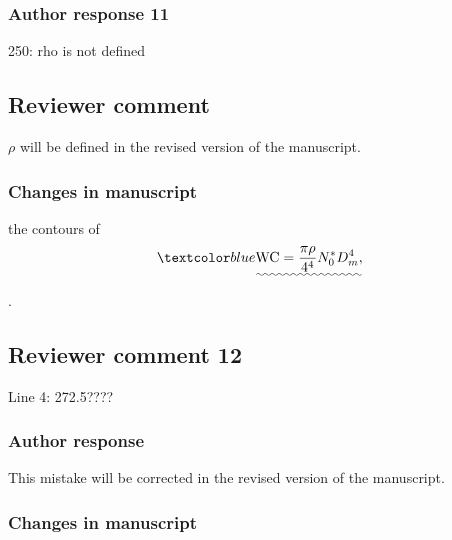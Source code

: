 %

\subsubsection*{Author response 11}
250: rho is not defined

\subsection*{Reviewer comment}

$\rho$ will be defined in the revised version of the manuscript.

\subsubsection*{Changes in manuscript}

\begin{change}[276]
\DIFaddend the contours of \DIFdelbegin {}\DIFdelend \DIFaddbegin {}\begin{align}
\DIFadd{\text{WC} = \frac{\pi \rho}{4 ^ 4}N_0^* D_m^4,
}\end{align}
\DIFaddend .
\end{change}

\subsection*{Reviewer comment 12}
Line 4: 272.5????

\subsubsection*{Author response}
This mistake will be corrected in the revised version of the manuscript.

\subsubsection*{Changes in manuscript}

